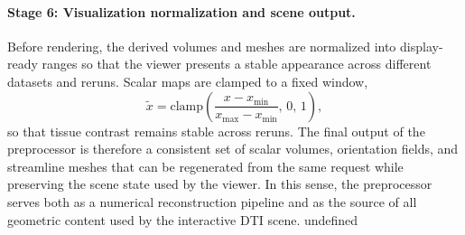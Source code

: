 \paragraph{Stage 6: Visualization normalization and scene output.}
Before rendering, the derived volumes and meshes are normalized into display-ready ranges so that the viewer presents a stable appearance across different datasets and reruns. Scalar maps are clamped to a fixed window,
\begin{equation}
\tilde{x} = \mathrm{clamp}\!\left(\frac{x - x_{\min}}{x_{\max} - x_{\min}},\, 0,\, 1\right),
\end{equation}
so that tissue contrast remains stable across reruns. The final output of the preprocessor is therefore a consistent set of scalar volumes, orientation fields, and streamline meshes that can be regenerated from the same request while preserving the scene state used by the viewer. In this sense, the preprocessor serves both as a numerical reconstruction pipeline and as the source of all geometric content used by the interactive DTI scene.
undefined
